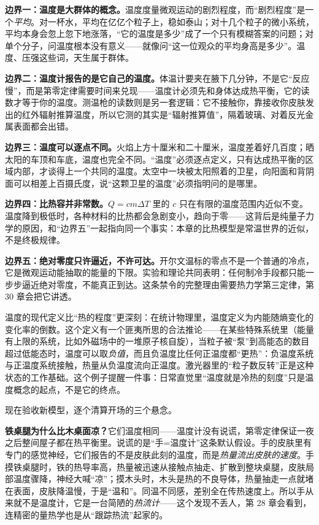 \textbf{边界一：温度是大群体的概念。}温度度量微观运动的剧烈程度，而“剧烈程度”是一个\emph{平均}。对一杯水，平均在亿亿个粒子上，稳如泰山；对十几个粒子的微小系统，平均本身会忽上忽下地涨落，“它的温度是多少”成了一个只有模糊答案的问题；对单个分子，问温度根本没有意义——就像问“这一位观众的平均身高是多少”。温度、压强这些词，天生属于群体。

\textbf{边界二：温度计报告的是它自己的温度。}体温计要夹在腋下几分钟，不是它“反应慢”，而是第零定律需要时间来兑现——温度计必须先和身体达成热平衡，它的读数才等于你的温度。测温枪的读数则是另一套逻辑：它不接触你，靠接收你皮肤发出的红外辐射推算温度，所以它测的其实是“辐射推算值”，隔着玻璃、对着反光金属表面都会出错。

\textbf{边界三：温度可以逐点不同。}火焰上方十厘米和二十厘米，温度差着好几百度；晒太阳的车顶和车底，温度也完全不同。“温度”必须逐点定义，只有达成热平衡的区域内部，才谈得上一个共同的温度。太空中一块被太阳照着的卫星，向阳面和背阴面可以相差上百摄氏度，说“这颗卫星的温度”必须指明问的是哪里。

\textbf{边界四：比热容并非常数。}\(Q=cm\Delta T\) 里的 \(c\) 只在有限的温度范围内近似不变。温度降到极低时，各种材料的比热都会急剧变小，趋向于零——这背后是纯量子力学的原因，和“边界五”一起指向同一个事实：本章的比热模型是常温世界的近似，不是终极规律。

\textbf{边界五：绝对零度只许逼近，不许可达。}开尔文温标的零点不是一个普通的冷点，它是微观运动能抽取的能量的下限。实验和理论共同表明：任何制冷手段都只能一步步逼近绝对零度，不能真正到达。这条禁令的完整理由需要热力学第三定律，第 30 章会把它讲透。

\begin{challenge}
温度的现代定义比“热的程度”更深刻：在统计物理里，温度定义为内能随熵变化的变化率的倒数。这个定义有一个匪夷所思的合法推论——在某些特殊系统里（能量有上限的系统，比如外磁场中的一堆原子核自旋），当粒子被“泵”到高能态的数目超过低能态时，温度可以取\emph{负值}，而且负温度比任何正温度都“更热”：负温度系统与正温度系统接触，热量从负温度流向正温度。激光器里的“粒子数反转”正是这种状态的工作基础。这个例子提醒一件事：日常直觉里“温度就是冷热的刻度”只是温度概念的起点，不是它的终点。
\end{challenge}


现在验收新模型，逐个清算开场的三个悬念。

\textbf{铁桌腿为什么比木桌面凉？}它们温度相同——温度计没有说谎，第零定律保证一夜之后整间屋子都在热平衡里。说谎的是“手=温度计”这条默认假设。手的皮肤里有专门的感觉神经，它们报告的不是皮肤此刻的温度，而是\emph{热量流出皮肤的速度}。手摸铁桌腿时，铁的热导率高，热量被迅速从接触点抽走、扩散到整块桌腿，皮肤局部温度骤降，神经大喊“凉”；摸木头时，木头是热的不良导体，热量抽走一点就堵在表面，皮肤降温慢，于是“温和”。同温不同感，差别全在传热速度上。所以手从来就不是温度计，它是一台简陋的\emph{热流计}——这个发现不丢人，第 28 章会看到，连精密的量热学也是从“跟踪热流”起家的。

